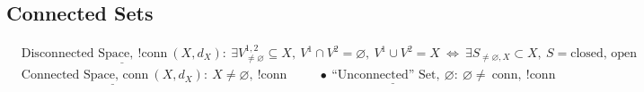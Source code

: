\documentclass{article}
\begin{document}
\vspace{10pt}
\subsection{Connected Sets}

\vspace{10pt}
\(
    \begin{aligned}
        & \underline{ \text{Disconnected Space},\ !\text{conn}\ (X,d_X)} :\ 
            \exists V^{1,2}_{\neq \varnothing} \subseteq X,\ V^1 \cap V^2 = \varnothing,\ V^1 \cup V^2 = X
            \ \Leftrightarrow\ \exists S_{\neq \varnothing, X} \subset X,\ S = \text{closed, open} 
            \\
        & \underline{ \text{Connected Space, conn}\ (X,d_X)} : \ X \neq \varnothing,\ !\text{conn}
            \hspace{30pt}
            \bullet\ \underline{ \text{``Unconnected'' Set},\ \varnothing } :\ \varnothing \neq\ \text{conn},\ \text{!conn}
            \\
    \end{aligned}
\)
\end{document}
